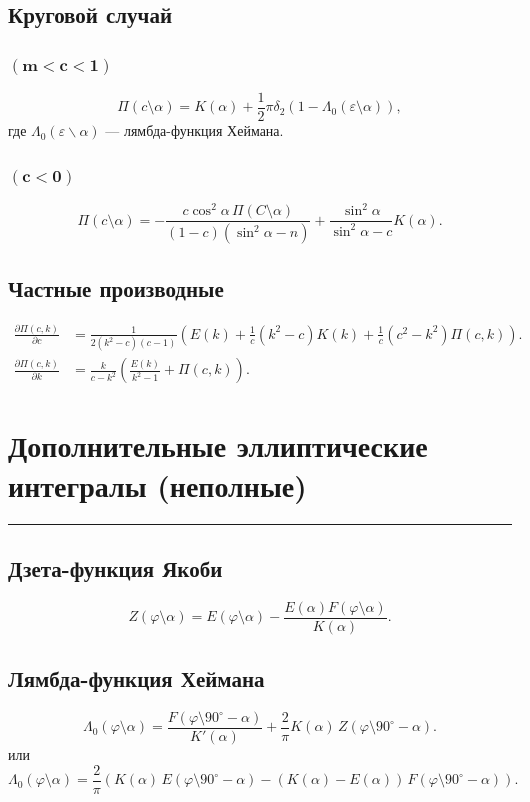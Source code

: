 \documentclass[fleqn]{article}
\begin{document}
	\subsection{Круговой случай}
	\subsubsection{$\mathbf{(m<c<1)}$}
	\begin{equation*}\Pi (c\setminus \alpha )=K(\alpha )+{\frac {1}{2}}\pi \delta _{2}\left(1-\Lambda _{0}(\varepsilon \setminus \alpha )\right),\end{equation*}
	где $\Lambda_0(\varepsilon\backslash\alpha)$ --- лямбда-функция Хеймана.
	\subsubsection{$\mathbf{(c<0)}$}
	\begin{equation*}\Pi (c\setminus \alpha )=-{\frac {c\cos ^{2}\alpha \,\Pi (C\setminus \alpha )}{(1-c)(\sin ^{2}\alpha -n)}}+{\frac {\sin ^{2}\alpha }{\sin ^{2}\alpha -c}}K(\alpha ).\end{equation*}
	\subsection{Частные производные}
	\begin{align*}{\frac {\partial \Pi (c,k)}{\partial c}}&={\frac {1}{2\left(k^{2}-c\right)(c-1)}}\left(E(k)+{\frac {1}{c}}\left(k^{2}-c\right)K(k)+{\frac {1}{c}}\left(c^{2}-k^{2}\right)\Pi (c,k)\right).\\
	{\frac {\partial \Pi (c,k)}{\partial k}}&={\frac {k}{c-k^{2}}}\left({\frac {E(k)}{k^{2}-1}}+\Pi (c,k)\right).
	\end{align*}
	\section{Дополнительные эллиптические интегралы (неполные)}
	\hrule
	\subsection{Дзета-функция Якоби}
	\begin{equation*}Z(\varphi \setminus \alpha )=E(\varphi \setminus \alpha )-{\frac {E(\alpha )F(\varphi \setminus \alpha )}{K(\alpha )}}.\end{equation*}
	\subsection{Лямбда-функция Хеймана}
	\begin{equation*}\Lambda _{0}(\varphi \setminus \alpha )={\frac {F(\varphi \setminus 90^{\circ }-\alpha )}{K'(\alpha )}}+{\frac {2}{\pi }}K(\alpha )\,Z(\varphi \setminus 90^{\circ }-\alpha ).\end{equation*}
	или
	\begin{equation*}\Lambda _{0}(\varphi \setminus \alpha )={\frac {2}{\pi }}\left(K(\alpha )\,E(\varphi \setminus 90^{\circ }-\alpha )-\left(K(\alpha )-E(\alpha )\right)\,F(\varphi \setminus 90^{\circ }-\alpha )\right).\end{equation*}
\end{document}
